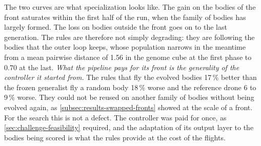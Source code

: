 The two curves are what specialization looks like. The gain on the bodies of the front saturates within the first half of the run, when the family of bodies has largely formed. The loss on bodies outside the front goes on to the last generation. The rules are therefore not simply degrading: they are following the bodies that the outer loop keeps, whose population narrows in the meantime from a mean pairwise distance of 1.56 in the genome cube at the first phase to 0.70 at the last. \emph{What the pipeline pays for its front is the generality of the controller it started from.} The rules that fly the evolved bodies 17\,\% better than the frozen generalist fly a random body 18\,\% worse and the reference drone 6 to 9\,\% worse. They could not be reused on another family of bodies without being evolved again, as \autoref{subsec:results-swapped-fronts} showed at the scale of a front. For the search this is not a defect. The controller was paid for once, as \autoref{sec:challenge-feasibility} required, and the adaptation of its output layer to the bodies being scored is what the rules provide at the cost of the flights.
